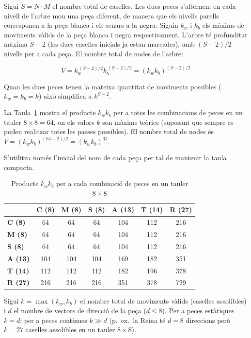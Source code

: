 \documentclass[conference,compsoc]{IEEEtran}
\begin{document}
Sigui $S = N \cdot M$ el nombre total de caselles. Les dues peces
s'alternen: en cada nivell de l'arbre mou una peça diferent, de manera
que els nivells parells corresponen a la peça blanca i els senars a la
negra. Siguin $k_w$ i $k_b$ els màxims de moviments vàlids de la peça
blanca i negra respectivament. L'arbre té profunditat màxima $S - 2$
(les dues caselles inicials ja estan marcades), amb $(S-2)/2$ nivells
per a cada peça. El nombre total de nodes de l'arbre:

\begin{equation}
\label{eq:worst}
V = k_w^{\,(S-2)/2} k_b^{\,(S-2)/2} = (k_w k_b)^{(S-2)/2}
\end{equation}

Quan les dues peces tenen la mateixa quantitat de moviments possibles
($k_w = k_b = k$) això simplifica a $k^{S-2}$.

La Taula~\ref{tab:kmax} mostra el producte $k_w  k_b$ per a
totes les combinacions de peces en un tauler $8 \times 8 = 64$, on els
valors $k$ son màxims teòrics (suposant que sempre es poden realitzar
totes les passes possibles). El nombre total de nodes és $V = (k_w k_b)^{(64-2)/2} = (k_w k_b)^{31}$.

S'utilitza només l'inicial del nom de cada peça per tal de mantenir
la taula compacta.

\begin{table}[h]
\centering
\caption{Producte $k_w k_b$ per a cada combinació de peces
         en un tauler $8\times8$}
\label{tab:kmax}
\footnotesize
\setlength{\tabcolsep}{5pt}
\begin{tabular}{l|cccccc}
\toprule
  & \textbf{C (8)} & \textbf{M (8)} & \textbf{S (8)}
  & \textbf{A (13)} & \textbf{T (14)} & \textbf{R (27)} \\
\midrule
\textbf{C (8)} &  64 &  64 &  64 & 104 & 112 & 216 \\
\textbf{M (8)} &  64 &  64 &  64 & 104 & 112 & 216 \\
\textbf{S (8)} &  64 &  64 &  64 & 104 & 112 & 216 \\
\textbf{A (13)} & 104 & 104 & 104 & 169 & 182 & 351 \\
\textbf{T (14)} & 112 & 112 & 112 & 182 & 196 & 378 \\
\textbf{R (27)} & 216 & 216 & 216 & 351 & 378 & 729 \\
\bottomrule
\end{tabular}
\end{table}

Sigui $k = \max(k_w, k_b)$ el nombre total de moviments vàlids
(caselles assolibles) i $d$ el nombre de vectors de direcció de la
peça ($d \leq 8$). Per a peces estàtiques $k = d$; per a peces
contínues $k \gg d$ (p.~ex.\ la Reina té $d = 8$ direccions però
$k = 27$ caselles assolibles en un tauler $8 \times 8$).
\end{document}
